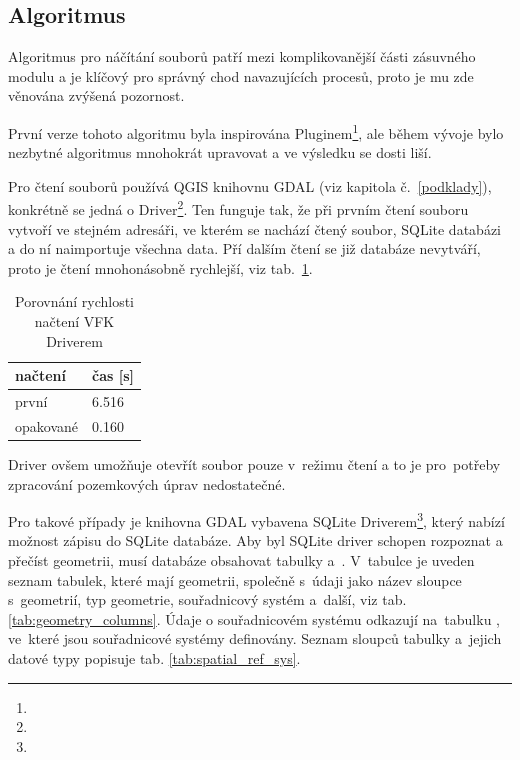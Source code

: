 \subsection{Algoritmus}
\label{nacteni_vfk_algoritmus}

Algoritmus pro náčítání  souborů patří mezi komplikovanější části zásuvného modulu a je klíčový pro správný chod navazujících procesů, proto je mu zde věnována zvýšená pozornost.

První verze tohoto algoritmu byla inspirována  Pluginem\footnote{}, ale během vývoje bylo nezbytné algoritmus mnohokrát upravovat a ve výsledku se dosti liší.

Pro čtení  souborů používá QGIS knihovnu GDAL (viz kapitola č.~\ref{podklady}), konkrétně se jedná o  Driver\footnote{}. Ten funguje tak, že při prvním čtení souboru vytvoří ve stejném adresáři, ve kterém se nachází čtený  soubor, SQLite databázi a do ní naimportuje všechna data. Pří dalším čtení se již databáze nevytváří, proto je čtení mnohonásobně rychlejší, viz tab.~\ref{tab:nacteni_vfk_driver}. 

\begin{table}[H]
    \begin{tabular}{|l|l|}
        \hline
         načtení & čas [s] \\
        \hline
        \hline
         první & 6.516 \\ \hline
         opakované & 0.160 \\
         \hline
    \end{tabular}
    \centering
    \caption[Porovnání rychlosti načtení VFK Driverem]{Porovnání rychlosti načtení VFK Driverem}
    \label{tab:nacteni_vfk_driver}
\end{table}

 Driver ovšem umožňuje otevřít  soubor pouze v~režimu čtení a to je pro~potřeby zpracování pozemkových úprav nedostatečné.

Pro takové případy je knihovna GDAL vybavena SQLite Driverem\footnote{}, který nabízí možnost zápisu do SQLite databáze. Aby byl SQLite driver schopen rozpoznat a přečíst geometrii, musí databáze obsahovat tabulky \textit{} a~\textit{}. V~tabulce \textit{} je uveden seznam tabulek, které mají geometrii, společně s~údaji jako název sloupce s~geometrií, typ geometrie, souřadnicový systém a~další, viz tab. \ref{tab:geometry_columns}. Údaje o souřadnicovém systému odkazují na~tabulku \textit{}, ve~které jsou souřadnicové systémy definovány. Seznam sloupců tabulky \textit{} a~jejich datové typy popisuje tab. \ref{tab:spatial_ref_sys}. 

